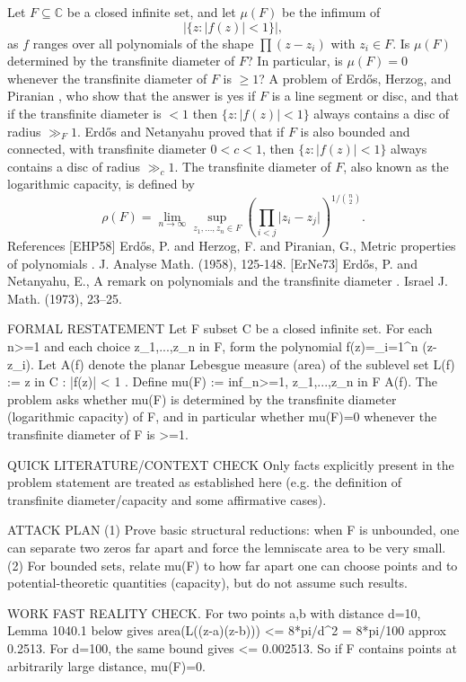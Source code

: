 Let $F\subseteq \mathbb{C}$ be a closed infinite set, and let $\mu(F)$ be the infimum of\[\lvert \{ z: \lvert f(z)\rvert < 1\}\rvert,\]as $f$ ranges over all polynomials of the shape $\prod (z-z_i)$ with $z_i\in F$. Is $\mu(F)$ determined by the transfinite diameter of $F$? In particular, is $\mu(F)=0$ whenever the transfinite diameter of $F$ is $\geq 1$? A problem of Erd\H{o}s, Herzog, and Piranian \cite{EHP58}, who show that the answer is yes if $F$ is a line segment or disc, and that if the transfinite diameter is $<1$ then $\{ z: \lvert f(z)\rvert < 1\}$ always contains a disc of radius $\gg_F 1$. Erd\H{o}s and Netanyahu \cite{ErNe73} proved that if $F$ is also bounded and connected, with transfinite diameter $0<c<1$, then $\{ z: \lvert f(z)\rvert < 1\}$ always contains a disc of radius $\gg_c 1$. The transfinite diameter of $F$, also known as the logarithmic capacity, is defined by\[\rho(F)=\lim_{n\to \infty}\sup_{z_1,\ldots,z_n\in F}\left(\prod_{i<j}\lvert z_i-z_j\rvert\right)^{1/\binom{n}{2}}.\] References [EHP58] Erd\H{o}s, P. and Herzog, F. and Piranian, G., Metric properties of polynomials . J. Analyse Math. (1958), 125-148. [ErNe73] Erd\H{o}s, P. and Netanyahu, E., A remark on polynomials and the transfinite diameter . Israel J. Math. (1973), 23--25.



FORMAL RESTATEMENT
Let F subset C be a closed infinite set. For each n>=1 and each choice z_1,...,z_n in F, form the polynomial f(z)=\prod_{i=1}^n (z-z_i).
Let A(f) denote the planar Lebesgue measure (area) of the sublevel set
  L(f) := { z in C : |f(z)| < 1 }.
Define
  mu(F) := inf_{n>=1, z_1,...,z_n in F} A(f).
The problem asks whether mu(F) is determined by the transfinite diameter (logarithmic capacity) of F, and in particular whether mu(F)=0 whenever the transfinite diameter of F is >=1.

QUICK LITERATURE/CONTEXT CHECK
Only facts explicitly present in the problem statement are treated as established here (e.g. the definition of transfinite diameter/capacity and some affirmative cases).

ATTACK PLAN
(1) Prove basic structural reductions: when F is unbounded, one can separate two zeros far apart and force the lemniscate area to be very small.
(2) For bounded sets, relate mu(F) to how far apart one can choose points and to potential-theoretic quantities (capacity), but do not assume such results.

WORK
FAST REALITY CHECK.
For two points a,b with distance d=10, Lemma 1040.1 below gives area(L((z-a)(z-b))) <= 8*pi/d^2 = 8*pi/100 approx 0.2513.
For d=100, the same bound gives <= 0.002513.
So if F contains points at arbitrarily large distance, mu(F)=0.

